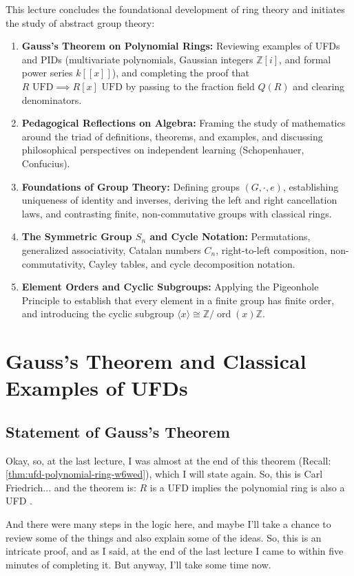 \begin{overview}
This lecture concludes the foundational development of ring theory and initiates the study of abstract group theory:
\begin{enumerate}[label=\textbf{(\arabic*)}]
    \item \textbf{Gauss's Theorem on Polynomial Rings:} Reviewing examples of UFDs and PIDs (multivariate polynomials, Gaussian integers $\mathbb{Z}[i]$, and formal power series $k[[x]]$), and completing the proof that $R \text{ UFD} \implies R[x] \text{ UFD}$ by passing to the fraction field $Q(R)$ and clearing denominators.
    \item \textbf{Pedagogical Reflections on Algebra:} Framing the study of mathematics around the triad of definitions, theorems, and examples, and discussing philosophical perspectives on independent learning (Schopenhauer, Confucius).
    \item \textbf{Foundations of Group Theory:} Defining groups $(G, \cdot, e)$, establishing uniqueness of identity and inverses, deriving the left and right cancellation laws, and contrasting finite, non-commutative groups with classical rings.
    \item \textbf{The Symmetric Group $S_n$ and Cycle Notation:} Permutations, generalized associativity, Catalan numbers $C_n$, right-to-left composition, non-commutativity, Cayley tables, and cycle decomposition notation.
    \item \textbf{Element Orders and Cyclic Subgroups:} Applying the Pigeonhole Principle to establish that every element in a finite group has finite order, and introducing the cyclic subgroup $\langle x \rangle \cong \mathbb{Z}/\operatorname{ord}(x)\mathbb{Z}$.
\end{enumerate}
\end{overview}

\section{Gauss's Theorem and Classical Examples of UFDs}

\subsection{Statement of Gauss's Theorem}

\begin{speech}[00:00:00 - 00:00:39]
Okay, so, at the last lecture, I was almost at the end of this theorem (Recall: \cref{thm:ufd-polynomial-ring-w6wed}), which I will state again. So, this is Carl Friedrich... and the theorem is: $R$ is a UFD implies the polynomial ring is also a UFD .

And there were many steps in the logic here, and maybe I'll take a chance to review some of the things and also explain some of the ideas. So, this is an intricate proof, and as I said, at the end of the last lecture I came to within five minutes of completing it. But anyway, I'll take some time now.
\end{speech}

